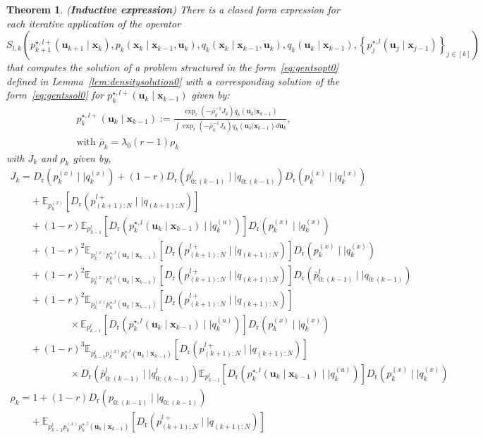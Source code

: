 \documentclass[a4paper,fleqn]{cas-sc}
\newcommand{\E}{\mathbb{E}}
\newcommand{\bv}[1]{\mathbf{#1}}
\newcommand{\Dr}[2]{{D}_{\text{r}}\left(#1\mid \mid #2 \right)}
\newcommand{\plant}[2]{p_{{#1}} \left(\bv{x}_{{#1}}\mid \bv{x}_{{#2}}, \bv{u}_{{#1}} \right)}
\newcommand{\shortplant}[1]{p_{{#1}}^{(x)}}
\newcommand{\optimalpolicygen}[3]{p^{\star,{#3}}_{{#1}} \left(\bv{u}_{{#1}}\mid \bv{x}_{{#2}} \right)}
\newcommand{\refplant}[2]{q_{{#1}} \left(\bv{x}_{{#1}}\mid \bv{x}_{{#2}}, \bv{u}_{{#1}} \right)}
\newcommand{\refpolicy}[2]{q_{{#1}}\left(\bv{u}_{{#1}}\mid \bv{x}_{{#2}} \right)}
\newtheorem{theorem}{Theorem}[section]
\begin{document}
\begin{theorem}\label{th:solnonefp} ({\bf Inductive expression})
There is a closed form expression for each iterative application of the operator \[
S_{l,k}\left(\optimalpolicygen{k+1}{k}{l+} ,\plant{k}{k-1},\refplant{k}{k-1},\refpolicy{k}{k-1},\left\{\optimalpolicygen{j}{j-1}{l}\right\}_{j\in[k]}\right)
\]
that computes the solution of a problem structured in the form~\eqref{eq:gentsopt0} defined in Lemma~\ref{lem:densitysolution0} with a corresponding solution of the form~\eqref{eq:gentssol0} for $\optimalpolicygen{k}{k-1}{l+}$ given by:
\begin{equation}\label{eq:backfpsolkthm}
    \begin{array}{l}
        \optimalpolicygen{k}{k-1}{l+}:= \frac{\exp_r\left(-\bar{\rho}_k^{-1}J_k \right)q_k(\bv{u}_k\vert \bv{x}_{k-1})}{\int \exp_r\left(-\bar{\rho}_k^{-1}J_k \right)q_k(\bv{u}_k\vert \bv{x}_{k-1}) d\bv{u}_k},\\
        \text{with } \bar{\rho}_k = \lambda_0(r-1)\rho_k
        \end{array}
    \end{equation}
    with $J_k$ and $\rho_k$ given by,
\begin{equation}\label{eq:backfpsolktermsthm}
\begin{array}{l}
J_k=\Dr{\shortplant{k}}{q^{(x)}_k}+(1-r) \Dr{\bar{p}^{l}_{0:(k-1)}}{q_{0:(k-1)}}\Dr{\shortplant{k}}{q^{(x)}_k} \\ 
\qquad+\E_{\shortplant{k}}\left[\Dr{p^{l+}_{(k+1):N}}{q_{(k+1):N}}\right]
 \\ \qquad +(1-r)\E_{p^l_{k-1}}\left[\Dr{\optimalpolicygen{k}{k-1}{l}}{q^{(u)}_k}\right]\Dr{\shortplant{k}}{q^{(x)}_k}\\ \qquad +
(1-r)^2\E_{\shortplant{k}\optimalpolicygen{k}{k-1}{l}}\left[\Dr{p^{l+}_{(k+1):N}}{q_{(k+1):N}}\right] \Dr{\shortplant{k}}{q^{(x)}_k} \\
\qquad +(1-r)^2\E_{\shortplant{k}\optimalpolicygen{k}{k-1}{l}}\left[\Dr{p^{l+}_{(k+1):N}}{q_{(k+1):N}}\right] \Dr{\bar{p}^{l}_{0:(k-1)}}{q_{0:(k-1)}}\\
\qquad +(1-r)^2 \E_{\shortplant{k}\optimalpolicygen{k}{k-1}{l}}\left[\Dr{p^{l+}_{(k+1):N}}{q_{(k+1):N}}\right] \\ \qquad\qquad\qquad\times\E_{p^l_{k-1}}\left[\Dr{\optimalpolicygen{k}{k-1}{l}}{q^{(u)}_k}\right]\Dr{\shortplant{k}}{q^{(x)}_k} \\
\qquad + (1-r)^3\E_{p^l_{k-1}\shortplant{k}\optimalpolicygen{k}{k-1}{l}}\left[\Dr{p^{l+}_{(k+1):N}}{q_{(k+1):N}}\right]\\ \qquad\qquad\qquad\times \Dr{\bar{p}^l_{0:(k-1)}}{q^l_{0:(k-1)}}\E_{p^l_{k-1}}\left[\Dr{\optimalpolicygen{k}{k-1}{l}}{q^{(u)}_k}\right]\Dr{\shortplant{k}}{q^{(x)}_k}
\\
\rho_k = 1+(1-r)\Dr{p_{0:(k-1)}}{q_{0:(k-1)}}\\
\qquad+\E_{p^l_{k-1}\shortplant{k}\optimalpolicygen{k}{k-1}{l}}\left[\Dr{p^{l+}_{(k+1):N}}{q_{(k+1):N}}\right]
\end{array}
\end{equation}
\end{theorem}
\end{document}
